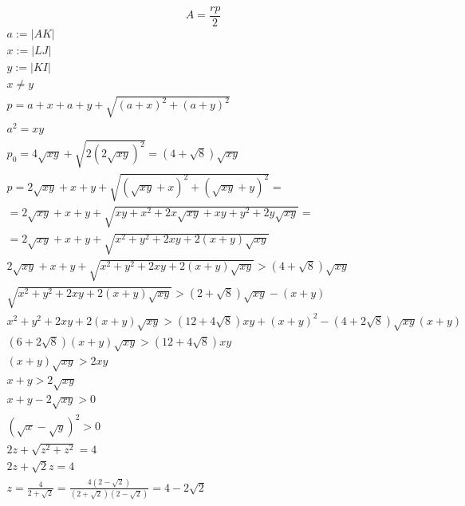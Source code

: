 \documentclass[30pt]{article}
\begin{document}
\[
A = \frac{rp}2
\]
\begin{align*}
a := |AK| \\
x := |LJ| \\
y := |KI| \\
x \ne y \\
p = a + x + a + y + \sqrt{(a+x)^2+(a+y)^2} \\
a^2=xy \\
p_0 = 4\sqrt{xy} + \sqrt{2(2\sqrt{xy})^2} = (4+\sqrt 8)\sqrt{xy} \\
p = 2\sqrt{xy} + x + y + \sqrt{(\sqrt{xy}+x)^2+(\sqrt{xy}+y)^2} = \\
= 2\sqrt{xy} + x + y + \sqrt{xy+x^2+2x\sqrt{xy}+xy+y^2+2y\sqrt{xy}} = \\
= 2\sqrt{xy} + x + y + \sqrt{x^2+y^2+2xy+2(x+y)\sqrt{xy}} \\
2\sqrt{xy} + x + y + \sqrt{x^2+y^2+2xy+2(x+y)\sqrt{xy}} > (4+\sqrt 8)\sqrt{xy} \\
\sqrt{x^2+y^2+2xy+2(x+y)\sqrt{xy}} > (2+\sqrt 8)\sqrt{xy} - (x + y) \\
x^2+y^2+2xy+2(x+y)\sqrt{xy} > (12+4\sqrt 8)xy + (x+y)^2 - (4+2\sqrt 8)\sqrt{xy}(x+y) \\
(6+2\sqrt 8)(x+y)\sqrt{xy} > (12+4\sqrt 8)xy \\
(x+y)\sqrt{xy} > 2xy \\
x+y > 2\sqrt{xy} \\
x+y-2\sqrt{xy} > 0 \\
(\sqrt x - \sqrt y)^2 > 0 \\
2z + \sqrt{z^2 + z^2} = 4 \\
2z + \sqrt 2 z = 4 \\
z = \frac 4 {2 + \sqrt 2} = \frac{4(2 - \sqrt 2)}{(2 + \sqrt 2)(2 - \sqrt 2)} = 4 - 2 \sqrt 2
\end{align*}
\end{document}

